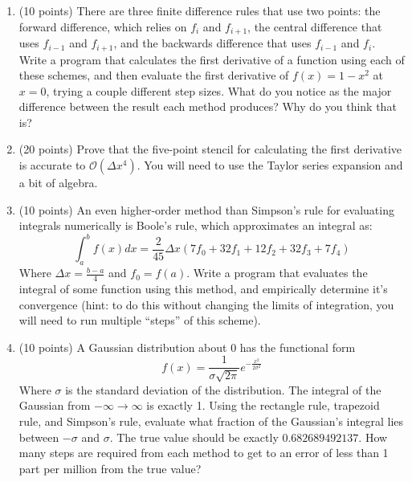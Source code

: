 \documentclass[11pt]{article}
\begin{document}
\begin{enumerate}
    \item (10 points) There are three finite difference rules that use two
        points: the forward difference, which relies on $f_i$ and $f_{i+1}$, the
        central difference that uses $f_{i-1}$ and $f_{i+1}$, and the backwards
        difference that uses $f_{i-1}$ and $f_{i}$.  Write a program that
        calculates the first derivative of a function using each of these
        schemes, and then evaluate the first derivative of $f(x) = 1-x^2$ at
        $x=0$, trying a couple different step sizes.  What do you notice as the
        major difference between the result each method produces?  Why do you
        think that is?

    \item (20 points) Prove that the five-point stencil for calculating the
        first derivative is accurate to $\mathcal{O}(\Delta x^4)$.  You will
        need to use the Taylor series expansion and a bit of algebra.

    \item (10 points) An even higher-order method than Simpson's rule for
        evaluating integrals numerically is Boole's rule, which approximates an
        integral as:
        $$ \int_a^b f(x) dx = \frac{2}{45}\Delta x (7f_0 + 32f_1 + 12f_2 + 32f_3
        + 7f_4)$$
        Where $\Delta x = \frac{b-a}{4}$ and $f_0 = f(a)$. Write a program that
        evaluates the integral of some function using this method, and
        empirically determine it's convergence (hint: to do this without
        changing the limits of integration, you will need to run multiple
        ``steps'' of this scheme).

    \item (10 points)  A Gaussian distribution about 0 has the functional form
        $$ f(x) = \frac{1}{\sigma\sqrt{2\pi}}e^{-\frac{x^2}{2\sigma^2}}$$ Where
        $\sigma$ is the standard deviation of the distribution.  The integral of
        the Gaussian from $-\infty\rightarrow\infty$ is exactly 1.  Using the
        rectangle rule, trapezoid rule, and Simpson's rule, evaluate what
        fraction of the Gaussian's integral lies between $-\sigma$ and $\sigma$.
        The true value should be exactly $0.682689492137$.  How many steps are
        required from each method to get to an error of less than 1 part per
        million from the true value?
\end{enumerate}
\end{document}
